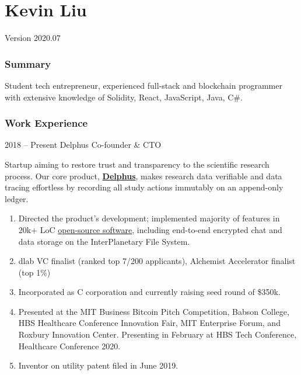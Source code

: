 \documentclass[paper=letter]{tccv}
\begin{document}
\part{Kevin Liu}


Version 2020.07

\section{Summary}

Student tech entrepreneur, experienced full-stack and blockchain programmer with extensive knowledge of Solidity, React, JavaScript, Java, C\#.

\section{Work Experience}

\begin{eventlist}

\item{2018 -- Present}
     {Delphus}
     {Co-founder \& CTO}

Startup aiming to restore trust and transparency to the scientific research process. Our core product, \href{https://delph.us}{\textbf{Delphus}}, makes research data verifiable and data tracing effortless by recording all study actions immutably on an append-only ledger.

\end{eventlist}

\vspace{-0.5cm}
\begin{enumerate}
     \item Directed the product's development; implemented majority of features in 20k+ LoC \href{https://gitlab.scintillating.us/scintillating/delphus}{open-source software}, including end-to-end encrypted chat and data storage on the InterPlanetary File System.
     \item dlab VC finalist (ranked top 7/200 applicants), Alchemist Accelerator finalist (top 1\%)
     \item Incorporated as C corporation and currently raising seed round of \$350k.
     \item Presented at the MIT Business Bitcoin Pitch Competition, Babson College, HBS Healthcare Conference Innovation Fair, MIT Enterprise Forum, and Roxbury Innovation Center. Presenting in February at HBS Tech Conference, Healthcare Conference 2020.
     \item Inventor on utility patent filed in June 2019.
\end{enumerate}
\end{document}
